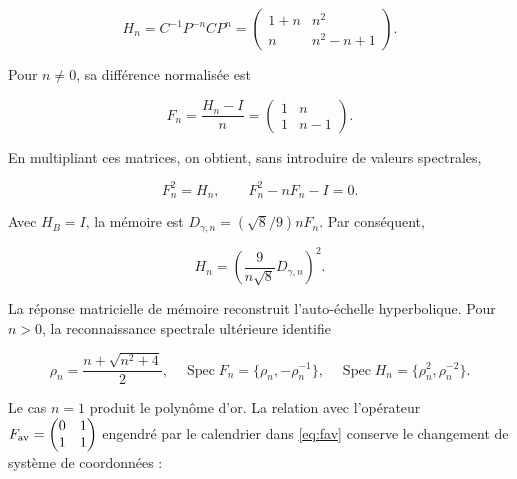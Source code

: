 \begin{equation}
H_n=C^{-1}P^{-n}CP^n
=\begin{pmatrix}1+n&n^2\\n&n^2-n+1\end{pmatrix}.
\label{nuc11:eq:28}
\end{equation}



Pour \(n\ne0\), sa différence normalisée est



\[
F_n=\frac{H_n-I}{n}
=\begin{pmatrix}1&n\\1&n-1\end{pmatrix}.
\]



En multipliant ces matrices, on obtient, sans introduire de valeurs spectrales,



\begin{equation}
\boxed{F_n^2=H_n,\qquad F_n^2-nF_n-I=0.}
\label{nuc11:eq:29}
\end{equation}



Avec \(H_B=I\), la mémoire est
\(D_{\gamma,n}=(\sqrt8/9)nF_n\).
Par conséquent,



\begin{equation}
\boxed{H_n=\left(\frac9{n\sqrt8}D_{\gamma,n}\right)^2.}
\label{nuc11:eq:30}
\end{equation}



La réponse matricielle de mémoire reconstruit l’auto-échelle
hyperbolique. Pour \(n>0\), la reconnaissance spectrale ultérieure
identifie



\begin{equation}
\rho_n=\frac{n+\sqrt{n^2+4}}2,\quad
\operatorname{Spec}F_n=\{\rho_n,-\rho_n^{-1}\},\quad
\operatorname{Spec}H_n=\{\rho_n^2,\rho_n^{-2}\}.
\label{nuc11:eq:31}
\end{equation}



Le cas \(n=1\) produit le polynôme d’or.
La relation avec l’opérateur
\(F_{\rm av}=
\begin{pmatrix}0&1\\1&1\end{pmatrix}\)
engendré par le calendrier dans \eqref{eq:fav} conserve le changement
de système de coordonnées :



